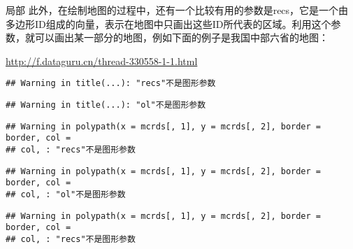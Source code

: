 \documentclass[]{article}
\newenvironment{Shaded}{\begin{snugshade}}{\end{snugshade}}
\newcommand{\KeywordTok}[1]{\textcolor[rgb]{0.13,0.29,0.53}{\textbf{#1}}}
\newcommand{\DataTypeTok}[1]{\textcolor[rgb]{0.13,0.29,0.53}{#1}}
\newcommand{\StringTok}[1]{\textcolor[rgb]{0.31,0.60,0.02}{#1}}
\newcommand{\CommentTok}[1]{\textcolor[rgb]{0.56,0.35,0.01}{\textit{#1}}}
\newcommand{\ControlFlowTok}[1]{\textcolor[rgb]{0.13,0.29,0.53}{\textbf{#1}}}
\newcommand{\OperatorTok}[1]{\textcolor[rgb]{0.81,0.36,0.00}{\textbf{#1}}}
\newcommand{\NormalTok}[1]{#1}
\begin{document}
局部
此外，在绘制地图的过程中，还有一个比较有用的参数是recs，它是一个由多边形ID组成的向量，表示在地图中只画出这些ID所代表的区域。利用这个参数，就可以画出某一部分的地图，例如下面的例子是我国中部六省的地图：

\url{http://f.dataguru.cn/thread-330558-1-1.html}

\begin{Shaded}
\end{Shaded}

\begin{verbatim}
## Warning in title(...): "recs"不是图形参数
\end{verbatim}

\begin{verbatim}
## Warning in title(...): "ol"不是图形参数
\end{verbatim}

\begin{verbatim}
## Warning in polypath(x = mcrds[, 1], y = mcrds[, 2], border = border, col =
## col, : "recs"不是图形参数
\end{verbatim}

\begin{verbatim}
## Warning in polypath(x = mcrds[, 1], y = mcrds[, 2], border = border, col =
## col, : "ol"不是图形参数
\end{verbatim}

\begin{verbatim}
## Warning in polypath(x = mcrds[, 1], y = mcrds[, 2], border = border, col =
## col, : "recs"不是图形参数
\end{verbatim}
\end{document}
